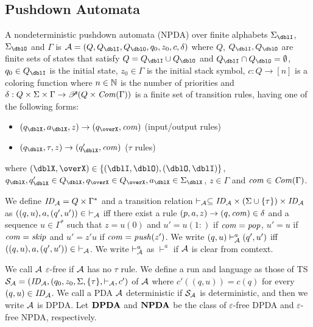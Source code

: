 \subsection{Pushdown Automata}

\begin{definition}
A nondeterministic {pushdown automata} (NPDA) over finite alphabets $\Sigma_\dblI$, $\Sigma_\dblO$ and $\Gamma$ is $\calA = (Q, Q_\dblI, Q_\dblO, q_0, z_0, c, \delta)$ where
$Q$, $Q_\dblI, Q_\dblO$ are finite sets of states that satisfy $Q=Q_\dblI\cup Q_\dblO$ and $Q_\dblI \cap Q_\dblO = \emptyset$,
$q_0\in Q_\dblI$ is the initial state,
$z_0\in \Gamma$ is the initial stack symbol,
$c: Q \to [n]$ is a coloring function where $n\in \mathbb{N}$ is the number of priorities and
$\delta: Q \times \Sigma \times \Gamma \to \mathscr{P}(Q \times \mathit{Com}(\Gamma))$ is a finite set of transition rules, having one of the following forms:
\begin{itemize}
\item $(q_\dblX, a_\dblX, z) \rightarrow (q_\overX, \com)$ (input/output rules)
\item $(q_\dblX, \tau, z)\to(q'_\dblX,\com)$ ($\tau$ rules)
\end{itemize}
where $(\dblX, \overX)\in\{(\dblI, \dblO), (\dblO,\dblI)\}$,
$q_\dblX, q'_\dblX\in Q_\dblX, q_\overX\in Q_\overX, a_\dblX\in \Sigma_\dblX$, $z\in \Gamma$ and $\mathit{com}\in \mathit{Com}(\Gamma)$.
\end{definition}
We define $\mathit{ID}_{\cal A}= Q\times \Gamma^*$ and
a transition relation $\vdash_{\cal A}\subseteq \mathit{ID}_{\cal A}\times (\Sigma\cup\{\tau\})\times \mathit{ID}_{\cal A}$ as
$((q,u),a,(q',u'))\in\ \vdash_{\cal A}$ iff there exist a rule $(p, a, z) \rightarrow (q, \mathit{com}) \in \delta$ and a sequence $u\in \Gamma^*$ such that $z=u(0)$ and $u'={u(1:)}$ if $\mathit{com}=\mathit{pop}$, $u'=u$ if $\mathit{com}=\mathit{skip}$ and $u'=z'u$ if $\mathit{com}=\mathit{push}(z')$.
We write $(q,u)\vdash^a_{\cal A}(q',u')$ iff
$((q,u),a,(q',u'))\in\ \vdash_{\cal A}$.
We write $\vdash^{a}_{\cal A}$ as $\vdash^{a}$ if ${\cal A}$ is clear from comtext.

We call ${\cal A}$ $\varepsilon$-free if ${\cal A}$ has no $\tau$ rule.
We define a run and language as those of TS ${\cal S}_{\cal A}=(\mathit{ID}_{\cal A}, (q_0,z_0,\Sigma, \{\tau\},\vdash_{\cal A},c')$ of ${\cal A}$ where $c'((q,u))= c(q)$ for every $(q,u)\in\mathit{ID}_{\cal A}$.
We call a PDA ${\cal A}$ deterministic if ${\cal S}_{\cal A}$ is deterministic,
and then we write ${\cal A}$ is DPDA.
Let ${\bf DPDA}$ and ${\bf NPDA}$ be the class of $\varepsilon$-free DPDA and $\varepsilon$-free NPDA, respectively.

